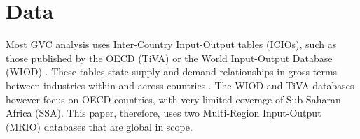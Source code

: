 \documentclass[a4paper]{article}
\begin{document}



\newpage

\section{Data}

Most GVC analysis uses Inter-Country Input-Output tables (ICIOs), such as those published by the OECD (TiVA) or the World Input-Output Database (WIOD)  \citep{timmer2012world}. These tables state supply and demand relationships in gross terms between industries within and across countries \citep{Kummritz2014}. The WIOD and TiVA databases however focus on OECD countries, with very limited coverage of Sub-Saharan Africa (SSA). This paper, therefore, uses two Multi-Region Input-Output (MRIO) databases that are global in scope. \newline %
\end{document}
